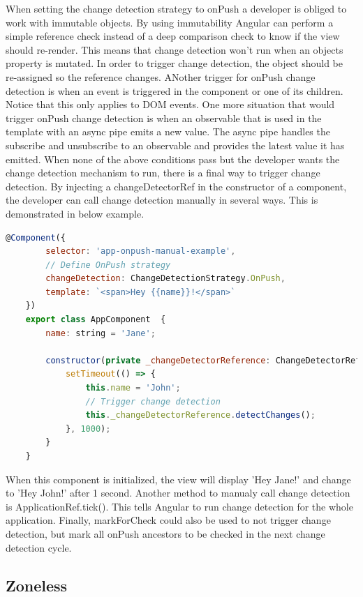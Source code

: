 When setting the change detection strategy to onPush a developer is obliged to work with immutable objects. By using immutability Angular can perform a simple reference check instead of a deep comparison check to know if the view should re-render. This means that change detection won't run when an objects property is mutated. In order to trigger change detection, the object should be re-assigned so the reference changes. ANother trigger for onPush change detection is when an event is triggered in the component or one of its children. Notice that this only applies to DOM events. One more situation that would trigger onPush change detection is when an observable that is used in the template with an async pipe emits a new value. The async pipe handles the subscribe and unsubscribe to an observable and provides the latest value it has emitted. When none of the above conditions pass but the developer wants the change detection mechanism to run, there is a final way to trigger change detection. By injecting a changeDetectorRef in the constructor of a component, the developer can call change detection manually in several ways. This is demonstrated in below example.
\begin{lstlisting}[language=JavaScript]
    @Component({
        selector: 'app-onpush-manual-example',
        // Define OnPush strategy
        changeDetection: ChangeDetectionStrategy.OnPush,
        template: `<span>Hey {{name}}!</span>`
    })
    export class AppComponent  {
        name: string = 'Jane';
        
        constructor(private _changeDetectorReference: ChangeDetectorRef){
            setTimeout(() => {
                this.name = 'John';
                // Trigger change detection
                this._changeDetectorReference.detectChanges();
            }, 1000);
        }      
    }
\end{lstlisting}

When this component is initialized, the view will display 'Hey Jane!' and change to 'Hey John!' after 1 second. Another method to manualy call change detection is ApplicationRef.tick(). This tells Angular to run change detection for the whole application. Finally, markForCheck could also be used to not trigger change detection, but mark all onPush ancestors to be checked in the next change detection cycle.

\subsection{Zoneless}


